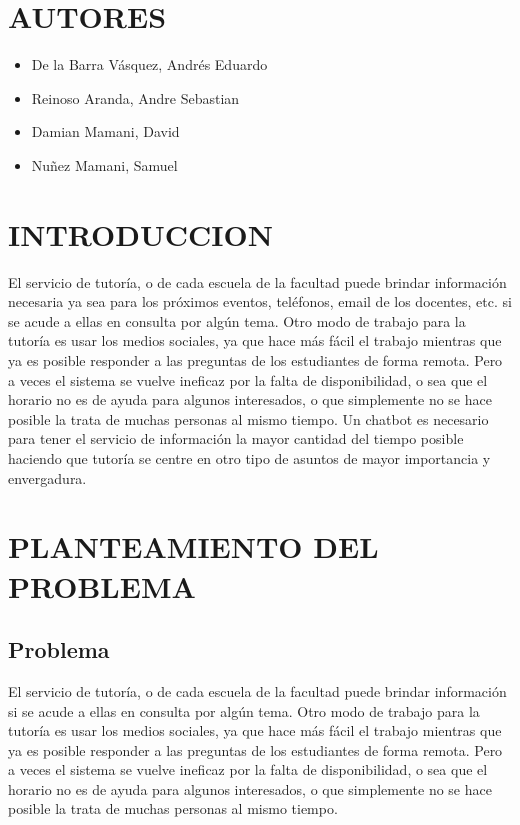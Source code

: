 \documentclass[12pt,letterpaper]{article}
\begin{document}
\section{AUTORES}

\begin{itemize}
	\item De la Barra Vásquez, Andrés Eduardo
	\item Reinoso Aranda, Andre Sebastian
	\item Damian Mamani, David
	\item Nuñez Mamani, Samuel
	
\end{itemize}


\section{INTRODUCCION}
El servicio de tutoría, o de cada escuela de la facultad puede brindar información necesaria ya sea para los próximos eventos, teléfonos, email de los docentes, etc. si se acude a ellas en consulta por algún tema. 
Otro modo de trabajo para la tutoría es usar los medios sociales, ya que hace más fácil el trabajo mientras que ya es posible responder a las preguntas de los estudiantes de forma remota. 
Pero a veces el sistema se vuelve ineficaz por la falta de disponibilidad, o sea que el horario no es de ayuda para algunos interesados, o que simplemente no se hace posible la trata de muchas personas al mismo tiempo.
Un chatbot es necesario para tener el servicio de información la mayor cantidad del tiempo posible haciendo que tutoría se centre en otro tipo de asuntos de mayor importancia y envergadura. 

\section{PLANTEAMIENTO DEL PROBLEMA}
	\subsection{Problema}
El servicio de tutoría, o de cada escuela de la facultad puede brindar información si se acude a ellas en consulta por algún tema. Otro modo de trabajo para la tutoría es usar los medios sociales, ya que hace más fácil el trabajo mientras que ya es posible responder a las preguntas de los estudiantes de forma remota. Pero a veces el sistema se vuelve ineficaz por la falta de disponibilidad, o sea que el horario no es de ayuda para algunos interesados, o que simplemente no se hace posible la trata de muchas personas al mismo tiempo.\\
\end{document}
